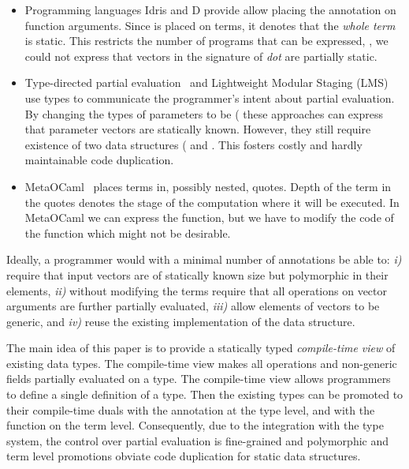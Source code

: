 \begin{itemize}
 \item Programming languages Idris and D provide allow placing the 
  annotation on function arguments. Since  is placed on terms, it
  denotes that the \emph{whole term} is static. This restricts the number of programs
  that can be expressed, \eg, we could not express that vectors in the signature of \emph{dot}
  are partially static.

 \item Type-directed partial evaluation~\cite{danvy1999type} and
  Lightweight Modular Staging (LMS)~\cite{rompf2012lightweight} use types to communicate
  the programmer's intent about partial evaluation. By changing the types of parameters
  to be (\eg {} these approaches can express that parameter vectors
  are statically known. However, they still require existence of two data structures
  (\eg {} and . This fosters costly and hardly maintainable
  code duplication.

 \item MetaOCaml~\cite{taha_multi-stage_1997} places terms in, possibly nested,
   quotes. Depth of the term in the quotes denotes the stage of the computation
   where it will be executed. In MetaOCaml we can express the  function,
   but we have to modify the code of the  function which might not be desirable.

\end{itemize}

Ideally, a programmer would with a minimal number of annotations be able to:
 \emph{i)} require that input vectors are of statically known size but polymorphic
  in their elements, \emph{ii)} without modifying the terms require that all operations
  on vector arguments are further partially evaluated, \emph{iii)} allow elements
  of vectors to be generic, and \emph{iv)} reuse the existing implementation of
  the  data structure.

The main idea of this paper is to provide a statically typed \emph{compile-time
 view} of existing data types. The compile-time view makes all operations and
 non-generic fields partially evaluated on a type. The compile-time view allows
 programmers to define a single definition of a type. Then the existing types
 can be promoted to their compile-time duals with the  annotation at
 the type level, and with the  function on the term level.
 Consequently, due to the integration with the type system, the control over
 partial evaluation is fine-grained and polymorphic and term level promotions
 obviate code duplication for static data structures.

